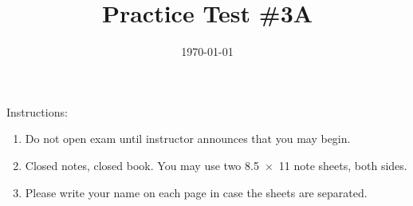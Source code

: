 \documentclass[exam,addpoints,noanswers]{exam}
\title{Practice Test \#3A}
\date{\today}
\author{\mobeardInstructorShort}
\begin{document}
\maketitle
\vfill
\mobeardExamNameBlock
\vfill
Instructions: 
\begin{enumerate}
\item Do not open exam until instructor announces that you may begin.
\item Closed notes, closed book.  You may use two \SI{8.5x11}{\inch} note sheets, both sides.
\item Please write your name on each page in case the sheets are separated. 
\end{enumerate}
\vfill
\begin{center}
\gradetable[h][questions]
\end{center}
\clearpage
\end{document}
